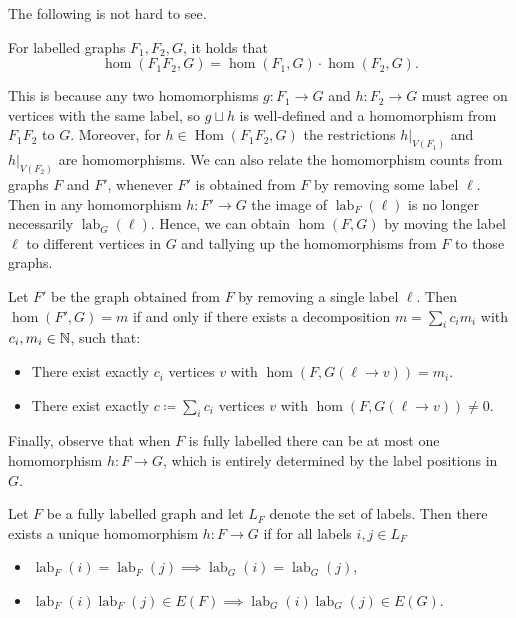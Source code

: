 \documentclass{lmcs}
\theoremstyle{plain}\newtheorem{claim}[thm]{Claim}   %
\newcommand{\NN}{\ensuremath \mathbb{N}}
\DeclareMathOperator{\HOM}{Hom}
\newcommand{\restrict}[1]{\vert_{#1}}
\DeclareMathOperator{\labfkt}{lab}
\begin{document}
The following is not hard to see.

\begin{obs}\label{prp:homproducts}
	For labelled graphs $F_1, F_2, G$, it holds that \[\hom(F_1F_2, G) = \hom(F_1, G) \cdot \hom(F_2, G).\]
\end{obs}

This is because any two homomorphisms $g \colon F_1 \to G$ and $h \colon F_2 \to G$ must agree on vertices with the same label, so $g \sqcup h$ is well-defined and a homomorphism from $F_1F_2$ to $G$.
Moreover, for $h \in \HOM(F_1F_2, G)$ the restrictions $h\restrict{V(F_1)}$ and $h\restrict{V(F_2)}$ are homomorphisms.
We can also relate the homomorphism counts from graphs $F$ and $F'$, whenever $F'$ is obtained from $F$ by removing some label $\ell$.
Then in any homomorphism $h \colon F' \to G$ the image of $\labfkt_F(\ell)$ is no longer necessarily $\labfkt_G(\ell)$.
Hence, we can obtain $\hom(F, G)$ by moving the label $\ell$ to different vertices in $G$ and tallying up the homomorphisms from $F$ to those graphs.


\begin{obs}\label{prp:homlabeldel}
	Let $F'$ be the graph obtained from $F$ by removing a single label $\ell$.
	Then $\hom(F', G) = m$ if and only if there exists a decomposition $m = \sum_ic_im_i$ with $c_i, m_i \in \NN$, such that:
	\begin{itemize}
		\item There exist exactly $c_i$ vertices $v$ with $\hom(F, G(\ell \rightarrow v)) = m_i$.
		\item There exist exactly $c \coloneqq \sum_i c_i$ vertices $v$ with $\hom(F, G(\ell \rightarrow v)) \neq 0$.
	\end{itemize}
\end{obs}

Finally, observe that when $F$ is fully labelled there can be at most one homomorphism $h \colon F \to G$, which is entirely determined by the label positions in $G$.

\begin{obs}
	Let $F$ be a fully labelled graph and let $L_F$ denote the set of labels.
	Then there exists a unique homomorphism $h \colon F \to G$ if for all labels $i, j \in L_F$
	\begin{itemize}
		\item $\labfkt_F(i) = \labfkt_F(j) \implies \labfkt_G(i) = \labfkt_G(j)$,
		\item $\labfkt_F(i)\labfkt_F(j) \in E(F) \implies \labfkt_G(i)\labfkt_G(j) \in E(G)$.
	\end{itemize}
\end{obs}
\end{document}
